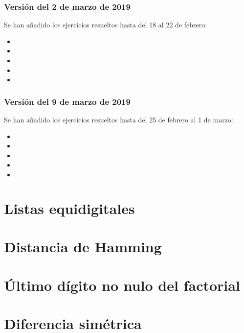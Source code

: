 \documentclass[a4paper,12pt,twoside]{book}
\begin{document}
\subsection*{Versión del 2 de marzo de 2019}

Se han añadido los ejercicios resueltos hasta del 18 al 22 de febrero:

\begin{itemize}
\item {}
\item {}
\item {}
\item {}
\item {}
\end{itemize}

\subsection*{Versión del 9 de marzo de 2019}

Se han añadido los ejercicios resueltos hasta del 25 de febrero al 1 de
marzo: 

\begin{itemize}
\item {}
\item {}
\item {}
\item {}
\item {}
\end{itemize}

\chapter{Listas equidigitales}

\chapter{Distancia de Hamming}

\chapter{Último dígito no nulo del factorial}

\chapter{Diferencia simétrica}
\end{document}
